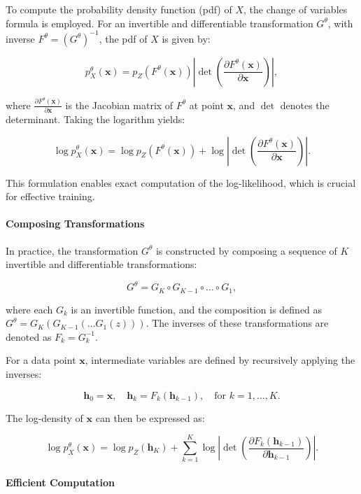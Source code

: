 To compute the probability density function (pdf) of $X$, the change of variables formula is employed. For an invertible and differentiable transformation $G^\theta$, with inverse $F^\theta = (G^\theta)^{-1}$, the pdf of $X$ is given by:

\[
p^\theta_X(\mathbf{x}) = p_Z\left(F^\theta(\mathbf{x})\right) \left| \det \left( \frac{\partial F^\theta(\mathbf{x})}{\partial \mathbf{x}} \right) \right|,
\]

\noindent where $\frac{\partial F^\theta(\mathbf{x})}{\partial \mathbf{x}}$ is the Jacobian matrix of $F^\theta$ at point $\mathbf{x}$, and $\det$ denotes the determinant. Taking the logarithm yields:

\[
\log p^\theta_X(\mathbf{x}) = \log p_Z\left(F^\theta(\mathbf{x})\right) + \log \left| \det \left( \frac{\partial F^\theta(\mathbf{x})}{\partial \mathbf{x}} \right) \right|.
\]

This formulation enables exact computation of the log-likelihood, which is crucial for effective training.

\paragraph{Composing Transformations}

In practice, the transformation $G^\theta$ is constructed by composing a sequence of $K$ invertible and differentiable transformations:

\[
G^\theta = G_K \circ G_{K-1} \circ \dots \circ G_1,
\]

\noindent where each $G_k$ is an invertible function, and the composition is defined as $G^\theta = G_K(G_{K-1}(\dots G_1(z)))$. The inverses of these transformations are denoted as $F_k = G_k^{-1}$.

For a data point $\mathbf{x}$, intermediate variables are defined by recursively applying the inverses:

\[
\mathbf{h}_0 = \mathbf{x}, \quad \mathbf{h}_k = F_k(\mathbf{h}_{k-1}), \quad \text{for } k = 1, \dots, K.
\]

The log-density of $\mathbf{x}$ can then be expressed as:

\[
\log p^\theta_X(\mathbf{x}) = \log p_Z(\mathbf{h}_K) + \sum_{k=1}^{K} \log \left| \det \left( \frac{\partial F_k(\mathbf{h}_{k-1})}{\partial \mathbf{h}_{k-1}} \right) \right|.
\]

\paragraph{Efficient Computation}

